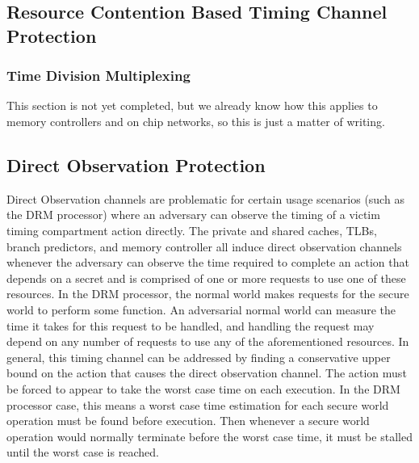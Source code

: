 \subsection{Resource Contention Based Timing Channel Protection}
\subsubsection{Time Division Multiplexing}
This section is not yet completed, but we already know how this applies to 
memory controllers and on chip networks, so this is just a matter of writing.

\subsection{Direct Observation Protection}
Direct Observation channels are problematic for certain usage scenarios (such 
as the DRM processor) where an adversary can observe the timing of a victim 
timing compartment action directly.  The private and shared caches, TLBs, 
branch predictors, and memory controller all induce direct observation channels 
whenever the adversary can observe the time required to complete an action that 
depends on a secret and is comprised of one or more requests to use one of 
these resources.  In the DRM processor, the normal world makes requests for the 
secure world to perform some function. An adversarial normal world can measure 
the time it takes for this request to be handled, and handling the request may 
depend on any number of requests to use any of the aforementioned resources. In 
general, this timing channel can be addressed by finding a conservative upper 
bound on the action that causes the direct observation channel. The action must 
be forced to appear to take the worst case time on each execution. In the DRM 
processor case, this means a worst case time estimation for each secure world 
operation must be found before execution. Then whenever a secure world 
operation would normally terminate before the worst case time, it must be 
stalled until the worst case is reached.
